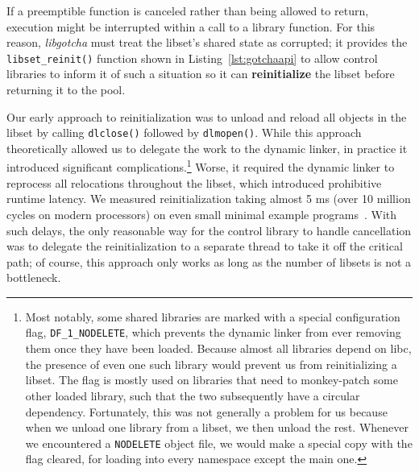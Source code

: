 \begin{promotesubsections}
\begin{swallowsections}


If a preemptible function is canceled rather than being allowed to return, execution
might be interrupted within a call to a library function.  For this reason,
\textit{libgotcha} must treat the libset's shared state as corrupted; it provides the
\texttt{libset\_reinit()} function shown in Listing~\ref{lst:gotchaapi} to allow
control libraries to inform it of such a situation so it can \textbf{reinitialize}
the libset before returning it to the pool.

Our early approach to reinitialization was to unload and reload all objects in the
libset by calling \texttt{dlclose()} followed by \texttt{dlmopen()}.  While this
approach theoretically allowed us to delegate the work to the dynamic linker, in
practice it introduced significant complications.\footnote{Most notably, some shared
libraries are marked with a special configuration flag, \texttt{DF\_1\_NODELETE},
which prevents the dynamic linker from ever removing them once they have been loaded.
Because almost all libraries depend on libc, the presence of even one such library
would prevent us from reinitializing a libset.  The flag is mostly used on libraries
that need to monkey-patch some other loaded library, such that the two subsequently
have a circular dependency.  Fortunately, this was not generally a problem for us
because when we unload one library from a libset, we then unload the rest.  Whenever
we encountered a \texttt{NODELETE} object file, we would make a special copy with the
flag cleared, for loading into every namespace except the main one.}  Worse, it
required the dynamic linker to reprocess all relocations throughout the libset, which
introduced prohibitive runtime latency.  We measured reinitialization taking almost 5
ms (over 10 million cycles on modern processors) on even small minimal example
programs~\cite{boucher:atc2020}.  With such delays, the only reasonable way for the
control library to handle cancellation was to delegate the reinitialization to a
separate thread to take it off the critical path; of course, this approach only works
as long as the number of libsets is not a bottleneck.


\end{swallowsections}
\end{promotesubsections}

